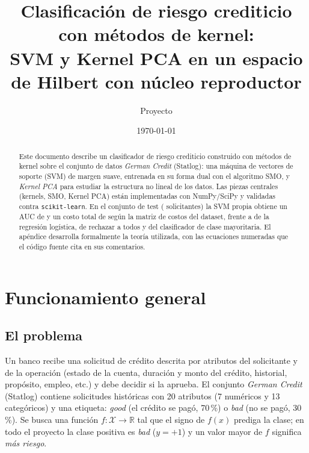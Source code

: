 \documentclass[11pt,a4paper]{article}
\title{Clasificación de riesgo crediticio con métodos de kernel:\\
       SVM y Kernel PCA en un espacio de Hilbert con núcleo reproductor}
\author{Proyecto \code{RKHS-Model}}
\date{\today}
\newcommand{\R}{\mathbb{R}}
\newcommand{\X}{\mathcal{X}}
\newcommand{\good}{\emph{good}}
\newcommand{\bad}{\emph{bad}}
\newcommand{\code}[1]{\texttt{#1}}
\theoremstyle{plain}
\theoremstyle{definition}
\theoremstyle{remark}
\numberwithin{equation}{section}
\begin{document}
\maketitle

\begin{abstract}
\noindent Este documento describe un clasificador de riesgo crediticio construido con métodos
de kernel sobre el conjunto de datos \emph{German Credit} (Statlog): una máquina de vectores
de soporte (SVM) de margen suave, entrenada en su forma dual con el algoritmo SMO, y
\emph{Kernel PCA} para estudiar la estructura no lineal de los datos. Las piezas centrales
(kernels, SMO, Kernel PCA) están implementadas con NumPy/SciPy y validadas contra
\code{scikit-learn}. En el conjunto de test (\ResNTest{} solicitantes) la SVM propia obtiene un
AUC de \ResSvmAuc{} y un costo total de \ResSvmCost{} según la matriz de costos del dataset,
frente a \ResLogregCost{} de la regresión logística, \ResAlwaysBadCost{} de rechazar a todos
y \ResMajorityCost{} del clasificador de clase mayoritaria. El apéndice desarrolla formalmente
la teoría utilizada, con las ecuaciones numeradas que el código fuente cita en sus comentarios.
\end{abstract}

\tableofcontents
\newpage

\section{Funcionamiento general}

\subsection{El problema}

Un banco recibe una solicitud de crédito descrita por atributos del solicitante y de la
operación (estado de la cuenta, duración y monto del crédito, historial, propósito, empleo,
etc.) y debe decidir si la aprueba. El conjunto \emph{German Credit} (Statlog)
\cite{statlog} contiene \ResNSamples{} solicitudes históricas con 20 atributos (7 numéricos
y 13 categóricos) y una etiqueta: \good{} (el crédito se pagó, 70\,\%) o \bad{} (no se pagó,
30\,\%). Se busca una función $f\colon\X\to\R$ tal que el signo de $f(x)$ prediga la clase;
en todo el proyecto la clase positiva es \bad{} ($y=+1$) y un valor mayor de $f$ significa
\emph{más riesgo}.
\end{document}
